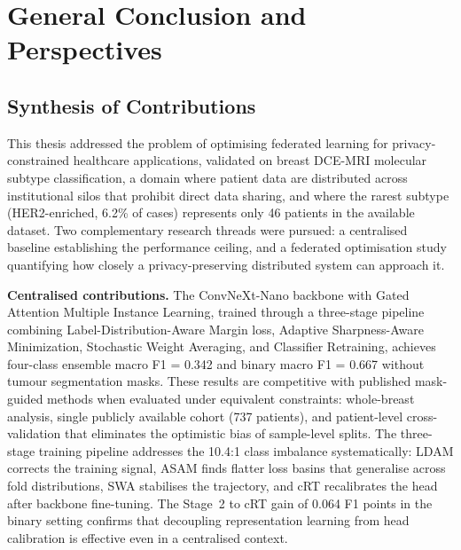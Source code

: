 
\chapter*{General Conclusion and Perspectives}
\label{chap:conclusion}

\section*{Synthesis of Contributions}

This thesis addressed the problem of optimising federated
learning for privacy-constrained healthcare applications,
validated on breast DCE-MRI molecular subtype classification,
a domain where patient data are distributed across
institutional silos that prohibit direct data sharing,
and where the rarest subtype (HER2-enriched, 6.2\% of cases)
represents only 46 patients in the available dataset.
Two complementary research threads were pursued: a
centralised baseline establishing the performance ceiling,
and a federated optimisation study quantifying how closely
a privacy-preserving distributed system can approach it.

\textbf{Centralised contributions.}
The ConvNeXt-Nano backbone with Gated Attention Multiple
Instance Learning, trained through a three-stage pipeline
combining Label-Distribution-Aware Margin loss, Adaptive
Sharpness-Aware Minimization, Stochastic Weight Averaging,
and Classifier Retraining, achieves four-class ensemble
macro F1 = 0.342 and binary macro F1 = 0.667 without
tumour segmentation masks.
These results are competitive with published mask-guided
methods when evaluated under equivalent constraints:
whole-breast analysis, single publicly available cohort
(737 patients), and patient-level cross-validation that
eliminates the optimistic bias of sample-level splits.
The three-stage training pipeline addresses the 10.4:1
class imbalance systematically: LDAM corrects the training
signal, ASAM finds flatter loss basins that generalise
across fold distributions, SWA stabilises the trajectory,
and cRT recalibrates the head after backbone fine-tuning.
The Stage~2 to cRT gain of 0.064 F1 points in the binary
setting confirms that decoupling representation learning
from head calibration is effective even in a centralised
context.

